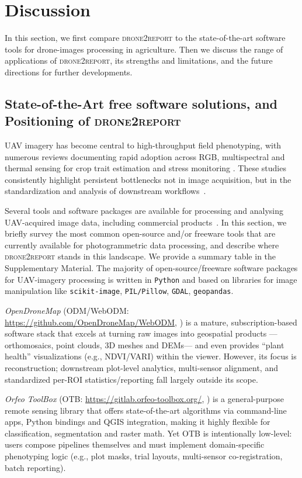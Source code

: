 \documentclass[drones,technicalnote,accept,pdftex,moreauthors]{Definitions/mdpi}
\begin{document}
\section{Discussion}
\label{discussion}
In this section, we first compare \textsc{drone2report} to the state-of-the-art software tools for drone-images processing in agriculture. Then we discuss the range of applications of \textsc{drone2report}, its strengths and limitations, and the future directions for further developments.

\subsection{State-of-the-Art free software solutions, and Positioning of \textsc{drone2report}}
UAV imagery has become central to high-throughput field phenotyping, with numerous reviews documenting rapid adoption across RGB, multispectral and thermal sensing for crop trait estimation and stress monitoring \cite{tanaka_review_2024, gano2024drone}. 
These studies consistently highlight persistent bottlenecks not in image acquisition, but in the standardization and analysis of downstream workflows~\cite{gano_dronebased_2024}.

Several tools and software packages are available for processing and analysing UAV-acquired image data, including commercial products~\cite{sharma2021development}. 
In this section, we briefly survey the most common open-source and/or freeware tools that are currently available for photogrammetric data processing, and describe where \textsc{drone2report} stands in this landscape. We provide a summary table in the Supplementary Material.
The majority of open-source/freeware software packages for UAV-imagery processing is written in \texttt{Python} and based on libraries for image manipulation like \texttt{scikit-image}, \texttt{PIL/Pillow}, \texttt{GDAL}, \texttt{geopandas}.

\textit{OpenDroneMap} (ODM/WebODM: \url{https://github.com/OpenDroneMap/WebODM}, \cite{vacca2020web}) is a mature, subscription-based software stack that excels at turning raw images into geospatial products —orthomosaics, point clouds, 3D meshes and DEMs— and even provides “plant health” visualizations (e.g., NDVI/VARI) within the viewer. However, its focus is reconstruction; downstream plot-level analytics, multi-sensor alignment, and standardized per-ROI statistics/reporting fall largely outside its scope.

\textit{Orfeo ToolBox} (OTB: \url{https://gitlab.orfeo-toolbox.org/}, \cite{noauthor_orfeo_nodate, grizonnet_orfeo_2017}) is a general-purpose remote sensing library that offers state-of-the-art algorithms via command-line apps, Python bindings and QGIS integration, making it highly flexible for classification, segmentation and raster math. Yet OTB is intentionally low-level: users compose pipelines themselves and must implement domain-specific phenotyping logic (e.g., plot masks, trial layouts, multi-sensor co-registration, batch reporting). 
\end{document}
